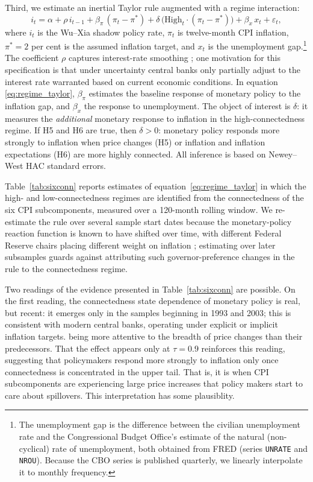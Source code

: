 \documentclass{article}
\begin{document}
Third,   we estimate an inertial Taylor rule augmented
with a regime interaction:
\begin{equation}
  i_t = \alpha + \rho\,i_{t-1} + \beta_\pi\,(\pi_t-\pi^*)
        + \delta\,\big(\text{High}_t\cdot(\pi_t-\pi^*)\big) + \beta_x\,x_t + \varepsilon_t,
  \label{eq:regime_taylor}
\end{equation}
where $i_t$ is the Wu--Xia \citep{wu2016measuring} shadow policy rate, $\pi_t$ is twelve-month
CPI inflation, $\pi^*=2$ per cent is the assumed inflation target, and $x_t$ is the
unemployment gap.\footnote{The unemployment gap is the difference between the civilian unemployment rate
and the Congressional Budget Office's estimate of the natural (non-cyclical) rate of
unemployment, both obtained from FRED (series \texttt{UNRATE} and \texttt{NROU}). Because
the CBO series is published quarterly, we linearly interpolate it to monthly frequency.} The coefficient $\rho$ captures interest-rate smoothing  \citep[p.151-152]{ClaridaGaliGertler2000}; one motivation for this specification is that under uncertainty central banks only partially adjust to the interest rate warranted based on current economic conditions. In equation   \ref{eq:regime_taylor}, $\beta_\pi$ estimates the
baseline response of monetary policy to the inflation gap, and $\beta_x$ the response to unemployment. The
object of interest is $\delta$: it measures the \emph{additional} monetary response to inflation in
the high-connectedness regime. If H5 and H6 are true, then $\delta>0$: monetary policy
responds more strongly to inflation when price changes (H5) or inflation and inflation expectations (H6) are more highly connected. All inference is based on
Newey--West HAC standard errors.  

 

Table~\ref{tab:sixconn} reports estimates of equation~\eqref{eq:regime_taylor} in which
the high- and low-connectedness regimes are identified from the connectedness of the six
CPI subcomponents, measured over a 120-month rolling window. We re-estimate the rule over
several sample start dates because the monetary-policy reaction function is known to have
shifted over time, with different Federal Reserve chairs placing different weight on
inflation \citep{ClaridaGaliGertler2000}; estimating over later subsamples guards against
attributing such governor-preference changes in the rule to the connectedness regime.  

Two readings of the evidence presented in Table~\ref{tab:sixconn} are possible. On the first reading, the connectedness state dependence of monetary policy is real, but
 recent: it emerges only in the samples beginning in 1993 and 2003; this is consistent with
modern central banks, operating under explicit or implicit inflation targets. being more
attentive to the breadth of price changes than their predecessors. That the effect appears
only at $\tau=0.9$ reinforces this reading, suggesting that policymakers respond more
strongly to inflation only once connectedness is concentrated in the upper tail. That is, it is when CPI subcomponents are experiencing large price increases that policy makers start to care about spillovers. This interpretation has some plausiblity. 
\end{document}
